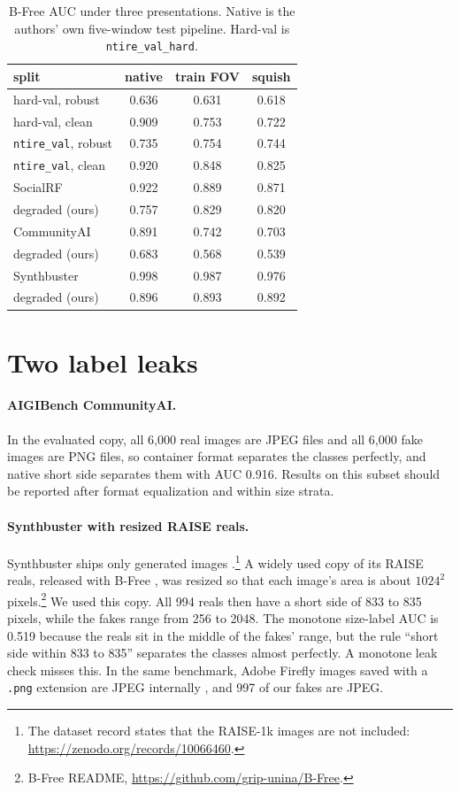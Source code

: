 \documentclass[letterpaper]{article} %
\begin{document}
\begin{table}[t]
\centering
\small
\setlength{\tabcolsep}{4pt}
\begin{tabular}{lccc}
\toprule
split & native & train FOV & squish \\
\midrule
hard-val, robust & 0.636 & 0.631 & 0.618 \\
hard-val, clean & 0.909 & 0.753 & 0.722 \\
\texttt{ntire\_val}, robust & 0.735 & 0.754 & 0.744 \\
\texttt{ntire\_val}, clean & 0.920 & 0.848 & 0.825 \\
\midrule
SocialRF & 0.922 & 0.889 & 0.871 \\
\quad degraded (ours) & 0.757 & 0.829 & 0.820 \\
CommunityAI & 0.891 & 0.742 & 0.703 \\
\quad degraded (ours) & 0.683 & 0.568 & 0.539 \\
Synthbuster & 0.998 & 0.987 & 0.976 \\
\quad degraded (ours) & 0.896 & 0.893 & 0.892 \\
\bottomrule
\end{tabular}
\caption{B-Free AUC under three presentations. Native is the authors' own
five-window test pipeline. Hard-val is \texttt{ntire\_val\_hard}.}
\label{tab:public}
\end{table}

\section{Two label leaks}
\label{sec:leaks}

\paragraph{AIGIBench CommunityAI.} In the evaluated copy, all 6,000 real images are JPEG files and all
6,000 fake images are PNG files, so container format separates the classes
perfectly, and native short side separates them with AUC 0.916. Results on this
subset should be reported after format equalization and within size strata.

\paragraph{Synthbuster with resized RAISE reals.} Synthbuster ships only
generated images \cite{bammey2024synthbuster}.\footnote{The dataset record
states that the RAISE-1k images are not included:
\url{https://zenodo.org/records/10066460}.} A widely used copy of its RAISE
reals, released with B-Free \cite{guillaro2025bfree}, was resized so that
each image's area is about $1024^2$ pixels.\footnote{B-Free README,
\url{https://github.com/grip-unina/B-Free}.} We used this copy. All 994 reals
then have a short side of 833 to 835 pixels, while the fakes range from 256
to 2048. The monotone size-label AUC is 0.519 because the reals sit in the
middle of the fakes' range, but the rule ``short side within 833 to 835''
separates the classes almost perfectly. A monotone leak check misses this. In
the same benchmark, Adobe Firefly images saved with a \texttt{.png} extension
are JPEG internally \cite{ricker2026biasid}, and 997 of our fakes are JPEG.
\end{document}
